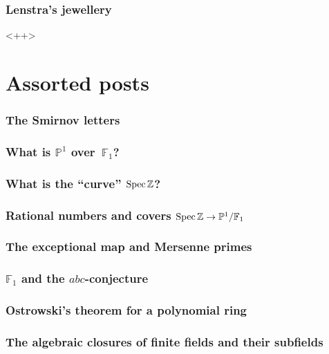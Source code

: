 \documentclass[a4paper]{memoir}
\begin{document}
\section{Lenstra's jewellery}<++>






\part{Assorted posts}

\setcounter{section}{0}

\section{The Smirnov letters}

\section{What is $\mathbb{P}^1$ over~$\mathbb{F}_1$?}

\section{What is the ``curve'' $\operatorname{Spec}\mathbb{Z}$?}

\section{Rational numbers and covers $\operatorname{Spec}\mathbb{Z}\to\mathbb{P}^1/\mathbb{F}_1$}

\section{The exceptional map and Mersenne primes}

\section{$\mathbb{F}_1$ and the $abc$-conjecture}

\section{Ostrowski's theorem for a polynomial ring}

\section{The algebraic closures of finite fields and their subfields}
\end{document}
